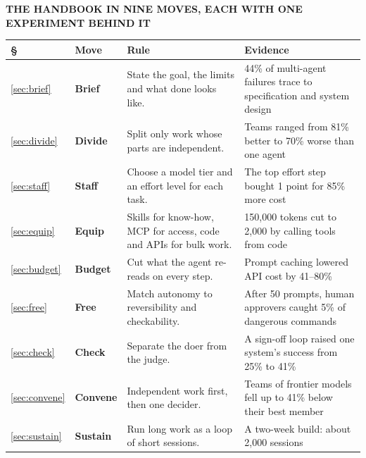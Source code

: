 \documentclass[11pt,letterpaper]{article}
\newcommand{\boxlabel}[1]{{\sffamily\footnotesize\bfseries\color{ink2} #1}}
\begin{document}
\vspace{0.4em}
\noindent\begin{minipage}{\textwidth}
\boxlabel{THE HANDBOOK IN NINE MOVES, EACH WITH ONE EXPERIMENT BEHIND IT}\par
\vspace{0.15em}
{\sffamily\small
\begin{tabularx}{\textwidth}{@{}l@{\hspace{0.9em}}l@{\hspace{1.2em}}Y@{\hspace{1.2em}}Y@{}}
\toprule
\textbf{\S} & \textbf{Move} & \textbf{Rule} & \textbf{Evidence} \\
\midrule
\ref{sec:brief} & \textbf{Brief} & State the goal, the limits and what done looks like. &
  44\% of multi-agent failures trace to specification and system design~\cite{mast} \\
\ref{sec:divide} & \textbf{Divide} & Split only work whose parts are independent. &
  Teams ranged from 81\% better to 70\% worse than one agent~\cite{kim} \\
\ref{sec:staff} & \textbf{Staff} & Choose a model tier and an effort level for each task. &
  The top effort step bought 1 point for 85\% more cost~\cite{datanorth} \\
\ref{sec:equip} & \textbf{Equip} & Skills for know-how, MCP for access, code and APIs for bulk work. &
  150,000 tokens cut to 2,000 by calling tools from code~\cite{mcpcode} \\
\ref{sec:budget} & \textbf{Budget} & Cut what the agent re-reads on every step. &
  Prompt caching lowered API cost by 41--80\%~\cite{cache} \\
\ref{sec:free} & \textbf{Free} & Match autonomy to reversibility and checkability. &
  After 50 prompts, human approvers caught 5\% of dangerous commands~\cite{newstack} \\
\ref{sec:check} & \textbf{Check} & Separate the doer from the judge. &
  A sign-off loop raised one system's success from 25\% to 41\%~\cite{mast} \\
\ref{sec:convene} & \textbf{Convene} & Independent work first, then one decider. &
  Teams of frontier models fell up to 41\% below their best member~\cite{pappu} \\
\ref{sec:sustain} & \textbf{Sustain} & Run long work as a loop of short sessions. &
  A two-week build: about 2,000 sessions~\cite{carlini} \\
\bottomrule
\end{tabularx}}
\end{minipage}
\end{document}
